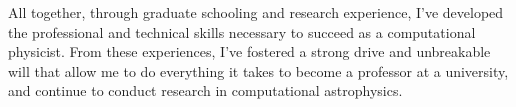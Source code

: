 \documentclass{article}
\begin{document}
All together, through graduate schooling and research experience, I've developed the professional and technical skills necessary to succeed as a computational physicist. From these experiences, I've fostered a strong drive and unbreakable will that allow me to do everything it takes to become a professor at a university, and continue to conduct research in computational astrophysics.   




  
\end{document}
